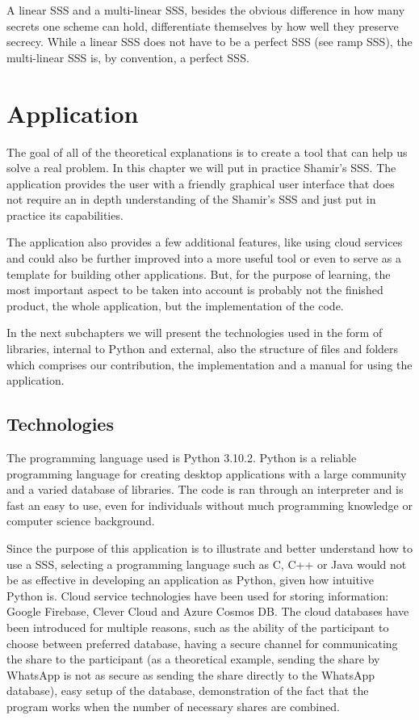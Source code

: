 \documentclass[12pt, a4paper, oneside]{book}
\begin{document}
    A linear SSS and a multi-linear SSS, besides the obvious difference in how many secrets one scheme can hold, differentiate themselves by how well they preserve secrecy. While a linear SSS does not have to be a perfect SSS (see ramp SSS), the multi-linear SSS is, by convention, a perfect SSS.
    
    \chapter{Application}
    The goal of all of the theoretical explanations is to create a tool that can help us solve a real problem. In this chapter we will put in practice Shamir's SSS. The application provides the user with a friendly graphical user interface that does not require an in depth understanding of the Shamir's SSS and just put in practice its capabilities. 
    
    The application also provides a few additional features, like using cloud services and could also be further improved into a more useful tool or even to serve as a template for building other applications. But, for the purpose of learning, the most important aspect to be taken into account is probably not the finished product, the whole application, but the implementation of the code.
    
    In the next subchapters we will present the technologies used in the form of  libraries, internal to Python and external, also the structure of files and folders which comprises our contribution, the implementation and a manual for using the application.
    \section{Technologies}
    The programming language used is Python 3.10.2. Python is a reliable programming language for creating desktop applications with a large community and a varied database of libraries. The code is ran through an interpreter and is fast an easy to use, even for individuals without much programming knowledge or computer science background. 
    
    Since the purpose of this application is to illustrate and better understand how to use a SSS, selecting a programming language such as C, C++ or Java would not be as effective in developing an application as Python, given how intuitive Python is. Cloud service technologies have been used for storing information: Google Firebase, Clever Cloud and Azure Cosmos DB. The cloud databases have been introduced for multiple reasons, such as the ability of the participant to choose between preferred database, having a secure channel for communicating the share to the participant (as a theoretical example, sending the share by WhatsApp is not as secure as sending the share directly to the WhatsApp database), easy setup of the database, demonstration of the fact that the program works when the number of necessary shares are combined. 
    
\end{document}

